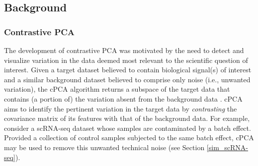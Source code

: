\subsection{Background}\label{back}


\subsubsection{Contrastive PCA}\label{cpca}

The development of contrastive PCA was motivated by the need to detect and visualize variation in the data deemed most relevant to the scientific question of interest. Given a target dataset believed to contain biological signal(s) of interest and a similar background dataset believed to comprise only noise (i.e., unwanted variation), the cPCA algorithm returns a subspace of the target data that contains (a portion of) the variation absent from the background data \cite{Abid2018}. cPCA aims to identify the pertinent variation in the target data by \textit{contrasting} the covariance matrix of its features with that of the background data. For example, consider a scRNA-seq dataset whose samples are contaminated by a batch effect. Provided a collection of control samples subjected to the same batch effect, cPCA may be used to remove this unwanted technical noise (see Section \ref{sim_scRNA-seq}).

